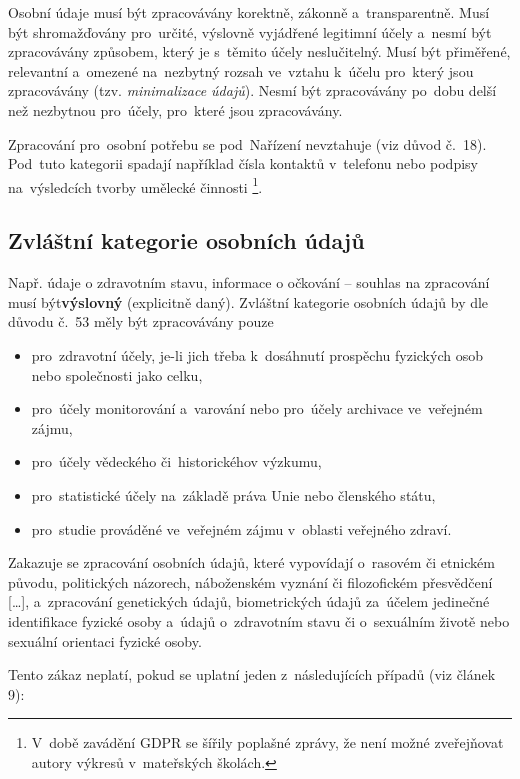 Osobní údaje musí být zpracovávány korektně, zákonně a~transparentně.
Musí být shromažďovány pro~určité, výslovně vyjádřené legitimní účely a~nesmí být zpracovávány způsobem, který je s~těmito účely neslučitelný.
Musí být přiměřené, relevantní a~omezené na~nezbytný rozsah ve~vztahu k~účelu pro~který jsou zpracovávány (tzv. \emph{minimalizace údajů}).
Nesmí být zpracovávány po~dobu delší než nezbytnou pro~účely, pro~které jsou zpracovávány.

Zpracování pro~osobní potřebu se pod~Nařízení nevztahuje (viz důvod č.~18).
Pod~tuto kategorii spadají například čísla kontaktů v~telefonu nebo podpisy na~výsledcích tvorby umělecké činnosti%
\footnote{V~době zavádění GDPR se šířily poplašné zprávy, že není možné zveřejňovat autory výkresů v~mateřských školách.}.

\subsection{Zvláštní kategorie osobních údajů}
Např. údaje o zdravotním stavu, informace o očkování -- souhlas na zpracování musí být\textbf{výslovný} (explicitně daný).
Zvláštní kategorie osobních údajů by dle důvodu č.~53 měly být zpracovávány pouze

\begin{itemize}
\item pro~zdravotní účely, je-li jich třeba k~dosáhnutí prospěchu fyzických osob nebo společnosti jako celku,
\item pro~účely monitorování a~varování nebo pro~účely archivace ve~veřejném zájmu,
\item pro~účely vědeckého či~historickéhov výzkumu,
\item pro~statistické účely na~základě práva Unie nebo členského státu,
\item pro~studie prováděné ve~veřejném zájmu v~oblasti veřejného zdraví.
\end{itemize}

Zakazuje se zpracování osobních údajů, které vypovídají o~rasovém či etnickém původu, politických názorech, náboženském vyznání či filozofickém přesvědčení [\dots], a~zpracování genetických údajů, biometrických údajů za~účelem jedinečné identifikace fyzické osoby a~údajů o~zdravotním stavu či o~sexuálním životě nebo sexuální orientaci fyzické osoby.

Tento zákaz neplatí, pokud se uplatní jeden z~následujících případů (viz článek 9):

